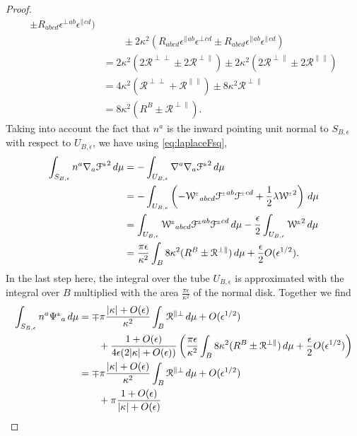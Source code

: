 \documentclass[a4paper,10pt,reqno]{amsart}
\newcommand{\bolt}{B}
\newcommand{\cR}{\mathcal{R}}
\theoremstyle{plain}
\newcommand{\PM}[1]{{{#1}^{\hspace{-.5pt}\scaleto{\pm}{3.5pt}}}}
\def\Wcal{\mathcal{W}}
\def\Fcal{\mathcal{F}}
\numberwithin{equation}{section}
\newcommand{\eps}{\epsilon}
\begin{document}
\begin{proof}
\begin{align}
\pm R_{abcd}\eps^\perp{}^{ab} \eps^\parallel{}^{cd} ) \\
&\qquad 
\pm 2\kappa^2 
( R_{abcd}\eps^\parallel{}^{ab} \eps^\perp{}^{cd} 
\pm R_{abcd}\eps^\parallel{}^{ab} \eps^\parallel{}^{cd} ) \\
&=
2\kappa^2 
( 2\cR^{\perp\perp} \pm 2\cR^{\perp\parallel} ) 
\pm 2\kappa^2 
( 2\cR^{\perp\parallel} \pm 2\cR^{\parallel\parallel} ) \\
&=
4\kappa^2 (\cR^{\perp\perp} + \cR^{\parallel\parallel} )
\pm 8\kappa^2 \cR^{\perp\parallel} \\
&=
8\kappa^2 ( R^\bolt \pm \cR^{\perp\parallel} ). 
\end{align}
Taking into account the fact that $n^a$ is the inward pointing unit normal to $S_{\bolt,\eps}$ with respect to $U_{\bolt,\eps}$, we have using 
\eqref{eq:laplaceFsq}, 
\begin{align}
\int_{S_{\bolt,\epsilon}} n^a \nabla_a \PM{\Fcal}^2 \, d\mu
&=
-\int_{U_{\bolt,\epsilon}} \nabla^a \nabla_a \PM{\Fcal}^2 \, d\mu \\
&=
-\int_{U_{\bolt,\epsilon}}
\left(
- \PM{\Wcal}_{abcd} \PM{\Fcal}^{ab} \PM{\Fcal}^{cd}
+ \frac{1}{2} \lambda  \PM{\Wcal}^2 
\right)
\, d\mu \\
&=
\int_{U_{\bolt,\epsilon}}
\PM{\Wcal}_{abcd} \PM{\Fcal}^{ab} \PM{\Fcal}^{cd} \, d\mu
- \frac{\epsilon}{2}
\int_{U_{\bolt,\epsilon}}  \PM{\Wcal}^2  \, d\mu \\
&=
\frac{\pi \eps}{ \kappa^2}
\int_\bolt 
8\kappa^2 ( R^\bolt \pm \cR^{\perp\parallel} ) \, d\mu
+ \frac{\epsilon}{2} O(\epsilon^{1/2}).
\end{align}
In the last step here, the integral over the tube $U_{\bolt,\epsilon}$ is approximated with the integral over $\bolt$ multiplied with the area $\frac{\pi \eps}{ \kappa^2}$ of the normal disk. Together we find 
\begin{align}
\int_{S_{\bolt,\epsilon}} n^a \PM\Psi_a \, d\mu
&=
\mp \pi\frac{|\kappa| + O(\epsilon)}{\kappa^2} 
\int_\bolt \cR^{\parallel\perp} \, d\mu
+ O(\epsilon^{1/2})
\\
&\qquad
+\frac{1 + O(\epsilon)}{4\epsilon (2|\kappa| + O(\epsilon) )} 
\left(
\frac{\pi \eps}{ \kappa^2}
\int_\bolt
8\kappa^2 ( R^\bolt \pm \cR^{\perp\parallel} ) \, d\mu
+ \frac{\epsilon}{2} O(\epsilon^{1/2})
\right) \\
&=
\mp \pi\frac{|\kappa| + O(\epsilon)}{\kappa^2} \int_\bolt \cR^{\parallel\perp} \, d\mu
+ O(\epsilon^{1/2})
\\
&\qquad
+ \pi\frac{1 + O(\epsilon)}{|\kappa| + O(\epsilon)}

\end{align}
\end{proof}
\end{document}
